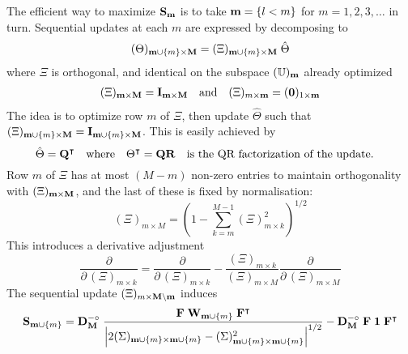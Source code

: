 \documentclass[a4paper, margin=1in, reqno]{RAMArticle}
\begin{document}
The efficient way to maximize \(\mathbf{S}_{\mathbf{m}}\) is to take \(\mathbf{m} = \left\lbrace l < m\right\rbrace\) for \(m=1,2,3,\ldots\) in turn.
Sequential updates at each \(m\) are expressed by decomposing to
\begin{equation*}
	(\Theta)_{\mathbf{m}\cup\left\lbrace m\right\rbrace\times\mathbf{M}} = (\Xi)_{\mathbf{m}\cup\left\lbrace m\right\rbrace\times\mathbf{M}} \; \hat{\Theta}
\end{equation*}
where \(\Xi\) is orthogonal, and identical on the subspace \((\mathbb{U})_{\mathbf{m}}\) already optimized
\begin{align*}
	(\Xi)_{\mathbf{m}\times\mathbf{M}} = \mathbf{I}_{\mathbf{m}\times\mathbf{M}} \quad \text{and} \quad
	(\Xi)_{m\times\mathbf{m}} = (\mathbf{0})_{1\times\mathbf{m}}
\end{align*}
The idea is to optimize row $m$ of $\Xi$, then update $\hat{\Theta}$ such that $(\Xi)_{\mathbf{m}\cup\left\lbrace m\right\rbrace\times\mathbf{M}} = \mathbf{I}_{\mathbf{m}\cup\left\lbrace m\right\rbrace\times\mathbf{M}}$. This is easily achieved by
\begin{equation*}
	\hat{\Theta} = \vr{Q}^{\intercal} \QT{where} \Theta^{\intercal} = \vr{Q}\vr{R} \QT{is the QR factorization of the update.}
\end{equation*}
Row $m$ of $\Xi$ has at most $(M-m)$ non-zero entries to maintain orthogonality with 
$(\Xi)_{\mathbf{m}\times\mathbf{M}}$, and the last of these is fixed by normalisation:
\begin{equation*}
	(\Xi)_{m\times M} = \left(1 - \sum_{k=m}^{M-1} (\Xi)_{m\times k}^{2} \right)^{1/2}
\end{equation*}
This introduces a derivative adjustment
\begin{equation*}
	\frac{\partial}{\partial\,(\Xi)_{m\times k}} = \frac{\partial}{\partial\,(\Xi)_{m\times k}} - 
	\frac{(\Xi)_{m \times k}}{(\Xi)_{m \times M}}\frac{\partial}{\partial\,(\Xi)_{m\times M}}
\end{equation*}
The sequential update \((\Xi)_{m\times\mathbf{M}\setminus\mathbf{m}}\) induces
\begin{equation*}
	\mathbf{S}_{\mathbf{m}\cup\left\lbrace m\right\rbrace}
	= \mathbf{D}_{\mathbf{M}}^{-\circ} \; 
	\frac{\mathbf{F}\; \mathbf{W}_{\mathbf{m}\cup\left\lbrace m\right\rbrace}\; \mathbf{F}^{\intercal}}
	{\left\lvert2(\Sigma)_{\mathbf{m}\cup\left\lbrace m\right\rbrace\times\mathbf{m}\cup\left\lbrace m\right\rbrace} - 
	(\Sigma)_{\mathbf{m}\cup\left\lbrace m\right\rbrace\times\mathbf{m}\cup\left\lbrace m\right\rbrace}^{2}\right\rvert^{1/2}}
	- \mathbf{D}_{\mathbf{M}}^{-\circ} \; \mathbf{F}\; \mathbf{1} \; \mathbf{F}^{\intercal}
\end{equation*}
\end{document}
